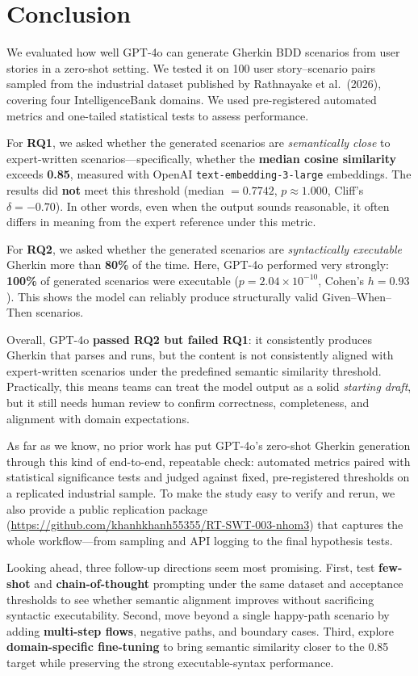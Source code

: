 \section{Conclusion}
\label{sec:conclusion}

We evaluated how well GPT-4o can generate Gherkin BDD scenarios from user stories in a zero-shot setting. We tested it on 100 user story--scenario pairs sampled from the industrial dataset published by Rathnayake et al.\ (2026), covering four IntelligenceBank domains. We used pre-registered automated metrics and one-tailed statistical tests to assess performance.

For \textbf{RQ1}, we asked whether the generated scenarios are \emph{semantically close} to expert-written scenarios---specifically, whether the \textbf{median cosine similarity} exceeds \textbf{0.85}, measured with OpenAI \texttt{text-embedding-3-large} embeddings. The results did \textbf{not} meet this threshold (median $=0.7742$, $p \approx 1.000$, Cliff's $\delta=-0.70$). In other words, even when the output sounds reasonable, it often differs in meaning from the expert reference under this metric.

For \textbf{RQ2}, we asked whether the generated scenarios are \emph{syntactically executable} Gherkin more than \textbf{80\%} of the time. Here, GPT-4o performed very strongly: \textbf{100\%} of generated scenarios were executable ($p=2.04 \times 10^{-10}$, Cohen's $h=0.93$). This shows the model can reliably produce structurally valid Given--When--Then scenarios.

Overall, GPT-4o \textbf{passed RQ2 but failed RQ1}: it consistently produces Gherkin that parses and runs, but the content is not consistently aligned with expert-written scenarios under the predefined semantic similarity threshold. Practically, this means teams can treat the model output as a solid \emph{starting draft}, but it still needs human review to confirm correctness, completeness, and alignment with domain expectations.

As far as we know, no prior work has put GPT-4o’s zero-shot Gherkin generation through this kind of end-to-end, repeatable check: automated metrics paired with statistical significance tests and judged against fixed, pre-registered thresholds on a replicated industrial sample. To make the study easy to verify and rerun, we also provide a public replication package (\url{https://github.com/khanhkhanh55355/RT-SWT-003-nhom3}) that captures the whole workflow—from sampling and API logging to the final hypothesis tests.

Looking ahead, three follow-up directions seem most promising. First, test \textbf{few-shot} and \textbf{chain-of-thought} prompting under the same dataset and acceptance thresholds to see whether semantic alignment improves without sacrificing syntactic executability. Second, move beyond a single happy-path scenario by adding \textbf{multi-step flows}, negative paths, and boundary cases. Third, explore \textbf{domain-specific fine-tuning} to bring semantic similarity closer to the 0.85 target while preserving the strong executable-syntax performance.